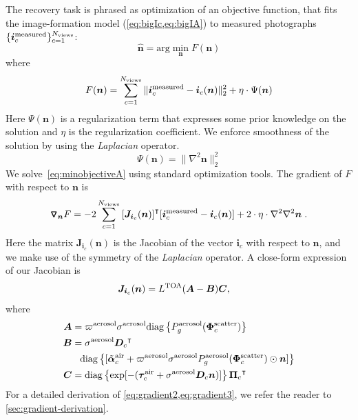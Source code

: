 \documentclass[10pt,letterpaper]{article}
\newcommand{\OpDiag}[1]{\mathrm{diag}\left\{#1\right\}}
\newcommand{\Grad}[1]{\bm{\triangledown_{#1}}}
\newcommand{\argmin}{\mathrm{arg}\min}
\newcommand{\vect}[1]{\bm{#1}}
\newcommand{\transpose}[1]{{#1}^\intercal}
\begin{document}
The recovery task is phrased as optimization of an objective function,
that fits the image-formation model (\cref{eq:bigIc,eq:bigIA}) to
measured photographs $\{ {\bm i}^{\rm measured}_c\}_{c=1}^{N_{\rm
    views}}$:
\begin{equation}
  \label{eq:minobjectiveA}
  \hat{\bm n} =
  \argmin_{{\bm n}} F({\bm n})
\end{equation}
where
\begin{equation}
  \label{eq:objectiveA}
  F({\bm n})
  = \sum_{c=1}^{N_{\rm views}}
  \| {\bm i}^{\rm measured}_c - {\bm i}_c({\bm n})\|^2_2 + \eta \cdot \Psi({\bm n})
\end{equation}
Here $\Psi({\bm n})$ is a regularization term that expresses some
prior knowledge on the solution and $\eta$ is the regularization
coefficient.  We enforce smoothness of the solution by using the
\emph{Laplacian} operator.
\begin{equation}
  \label{eq:regularizer}
  \Psi({\bm n}) = \| \nabla^2{\bm n}\|^2_2
\end{equation}
We solve~\cref{eq:minobjectiveA} using standard optimization tools.
The gradient of $F$ with respect to ${\bm n}$ is
\begin{align}
  \Grad{{\bm n}} F = -2\sum_{c=1}^{N_{\rm views}}
  \transpose{\left[{\bm J}_{{\bm i}_c}({\bm n})\right]} [{\bm i}^{\rm
    measured}_c - {\bm i}_c({\bm n})] + 2 \cdot \eta \cdot
  \nabla^2\nabla^2{\bm n} \;.
  \label{eq:gradient1}
\end{align}
Here the matrix ${\bm J}_{{\bm i}_c}({\bm n})$ is the Jacobian of the
vector ${\bm i}_c$ with respect to ${\bm n}$, and we make use of the
symmetry of the \emph{Laplacian} operator. A close-form expression of
our Jacobian is
\begin{align}
  {\bm J}_{{\bm i}_c}({\bm n}) &= L^{\rm TOA}({\bm A}-{\bm B}){\bm C}
  ,
  \label{eq:gradient2}
\end{align}
where
\begin{align}
  \label{eq:gradient3}
  {\bm A} &= \varpi^{\rm aerosol}\sigma^{\rm aerosol}
  \OpDiag{ P_g^{\rm aerosol}(\vect{\Phi}^{\rm scatter}_c)} \nonumber\\
  {\bm B} &= {\sigma}^{\rm aerosol}\transpose{{\bm D}_c} \nonumber\\
  & \;\;\; \OpDiag{[\tilde{\vect{\alpha}}^{\rm air}_c + \varpi^{\rm
      aerosol}\sigma^{\rm aerosol} P^{\rm aerosol}_g(\vect{\Phi}^{\rm
      scatter}_c) \odot{\bm n}
    ]} \nonumber \\
  {\bm C} &= \OpDiag{\exp[-(\vect{\tau}_c^{\rm air} + {\sigma}^{\rm
      aerosol} {\bm D}_c {\bm n})]} \transpose{{\vect{\Pi}}_c}
\end{align}
For a detailed derivation of \cref{eq:gradient2,eq:gradient3}, we
refer the reader to \cref{sec:gradient-derivation}.
\end{document}
